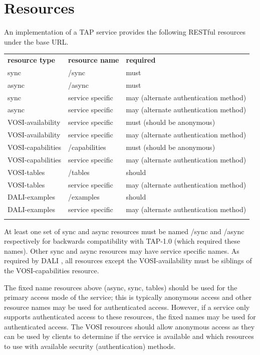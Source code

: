 \documentclass[11pt,letter]{ivoa}
\begin{document}
\section{Resources}
\label{sec:resources}

An implementation of a TAP service provides the following RESTful resources 
under the base URL.

\medskip
\begin{inlinetable}
\begin{tabular}{l l l}
\sptablerule
\textbf{resource type} & \textbf{resource name} & \textbf{required} \\
\sptablerule
{sync} & /sync & must \\
{async} & /async & must \\
{sync} & service specific & may (alternate authentication method) \\
{async} & service specific & may (alternate authentication method) \\
VOSI-availability & service specific & must (should be anonymous) \\
VOSI-availability & service specific & may (alternate authentication method) \\
VOSI-capabilities & /capabilities & must (should be anonymous) \\
VOSI-capabilities & service specific & may (alternate authentication method) \\
VOSI-tables & /tables & should \\
VOSI-tables & service specific & may (alternate authentication method) \\
DALI-examples & /examples & should \\
DALI-examples & service specific & may (alternate authentication method) \\
\sptablerule
\end{tabular}
\end{inlinetable}
\medskip

At least one set of {sync} and {async} resources must be named /sync and 
/async respectively for backwards compatibility with TAP-1.0 (which required 
these names). Other  {sync} and {async} resources may have service specific names. 
As required by DALI \citep{std:DALI11}, all resources except the VOSI-availability must 
be siblings of the VOSI-capabilities resource. 

The fixed name resources above (async, sync, tables) should be used for the 
primary access mode of the service; this is typically anonymous access and 
other resource names may be used for authenticated access. However, if a 
service only supports authenticated access to these resources, the fixed names 
may be used for authenticated access. The VOSI resources should allow anonymous 
access as they can be used by clients to determine if the service is available 
and which resources to use with available security (authentication) methods. 
\end{document}
